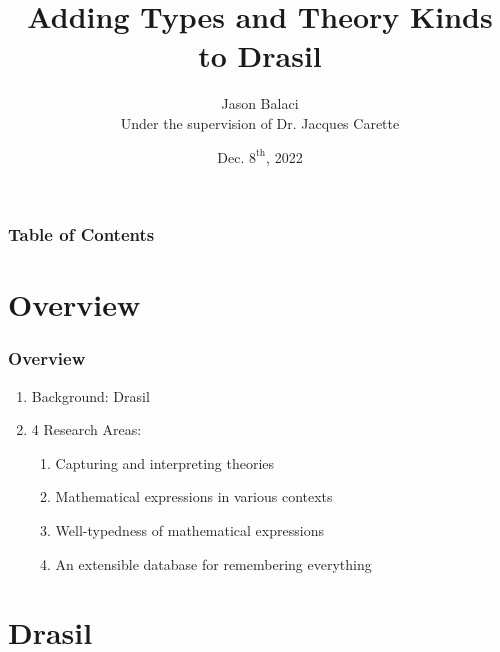 \documentclass[xcolor={dvipsnames}]{beamer}
\title{Adding Types and Theory Kinds to Drasil}
\author[J. Balaci]{Jason Balaci\\\small{}Under the supervision of Dr. Jacques Carette}
\institute[McMaster U.]{McMaster University}
\date{Dec. $8^{\text{th}}$, 2022}
\begin{document}
\frame{\titlepage}


\begin{frame}
\frametitle{Table of Contents}
\tableofcontents
\end{frame}

\section{Overview}

\begin{frame}
  \frametitle{Overview}

  \begin{enumerate}
    \item Background: Drasil
    \item 4 Research Areas:
      \begin{enumerate}
        \item Capturing and interpreting theories
        \item Mathematical expressions in various contexts
        \item Well-typedness of mathematical expressions
        \item An extensible database for remembering everything
      \end{enumerate}
  \end{enumerate}

\end{frame}

\section{Drasil}
\end{document}

